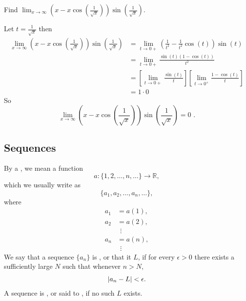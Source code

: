 \begin{exercise}
    Find 
    \( \lim_{x \to \infty} \left( x - x \cos{ \left( \frac{1}{\sqrt{x}} \right) } \right) \sin{ \left( \frac{1}{\sqrt{x}} \right) }\).
\end{exercise}
\begin{solution}
    Let \( t = \frac{1}{\sqrt{x}} \) then 
    \begin{align*}
     \lim_{x \to \infty} \left( x - x \cos{ \left( \frac{1}{\sqrt{x}} \right) } \right) \sin{ \left( \frac{1}{\sqrt{x}} \right) } &= \lim_{t \to 0+} \left( \frac{1}{t^{2}} - \frac{1}{t^{2}} \cos{ \left( t \right) } \right) \sin{ \left( t \right) } \\
     &= \lim_{t \to 0+} \frac{ \sin{ \left( t  \right) } \left( 1- \cos{ \left( t \right) } \right)}{t^{2}} \\
     &= \left[ \lim_{t \to 0+}\frac{ \sin{ \left( t \right) }}{t} \right] \left[ \lim_{t \to 0^{+}}  \frac{1- \cos{ \left( t \right) }}{t}\right] \\
     &= 1 \cdot 0
    \end{align*}
    So 
    \[ \boxed{\lim_{x \to \infty} \left( x - x \cos{ \left( \frac{1}{\sqrt{x}} \right) } \right) \sin{ \left( \frac{1}{\sqrt{x}} \right) } =0 \text{ .}} \]
\end{solution}

\subsection{Sequences} 

\begin{dfn}
    By a , we mean a function 
    \[
        a: \{ 1, 2, \dots, n, \dots \} \to \mathbb{R},
    \]
    which we usually write as 
    \[
        \{ a_{1}, a_{2}, \dots, a_{n}, \dots \},
    \]
    where
    \begin{align*}
        a_{1} &= a(1), \\
        a_{2} &= a(2), \\
              &\ \ \vdots \\
        a_{n} &= a(n), \\
              &\ \ \vdots
    \end{align*}
    We say that a sequence \( \{ a_n \} \) is , or that it  \( L \), if for every \( \epsilon > 0 \) there exists a sufficiently large \( N \) such that whenever \( n > N \),
    \[
        \abs{a_{n} - L} < \epsilon.
    \]
    A sequence is , or said to , if no such \( L \) exists.
\end{dfn}

